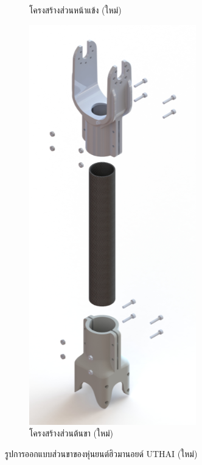 \begin{figure}[!ht]
\begin{subfigure}[b]{0.3\linewidth}
      \caption{โครงสร้างส่วนหน้าแข้ง (ใหม่)}
    \end{subfigure}
    \begin{subfigure}[b]{0.3\linewidth}
      \includegraphics[width=\linewidth]{chapter4/images/carb_thigh.PNG}
      \caption{โครงสร้างส่วนต้นขา (ใหม่)}
    \end{subfigure}
    \caption{รูปการออกแบบส่วนขาของหุ่นยนต์ฮิวมานอยด์ UTHAI (ใหม่)}
    \label{fig:newleg}
  \end{figure}

